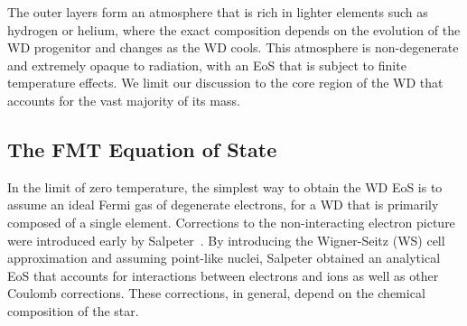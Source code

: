 The outer layers form an atmosphere that is rich in lighter elements such as hydrogen or helium, where the exact composition depends on the evolution of the WD progenitor and changes as the WD cools. 
This atmosphere is non-degenerate and extremely opaque to radiation, with an EoS that is subject to finite temperature effects. We limit our discussion to the core region of the WD that accounts for the vast majority of its mass.

\subsection{The FMT Equation of State}


In the limit of zero temperature, the simplest way to obtain the WD EoS is to assume an ideal Fermi gas of degenerate electrons, for a WD that is primarily composed of a single element. Corrections to the non-interacting electron picture were introduced early by Salpeter~\cite{Salpeter:1961zz_nov_Energypressurezerotemperature}. By introducing the Wigner-Seitz (WS) cell approximation and assuming point-like nuclei, Salpeter obtained an analytical EoS that accounts for interactions between electrons and ions as well as other Coulomb corrections. These corrections, in general, depend on the chemical composition of the star. 


